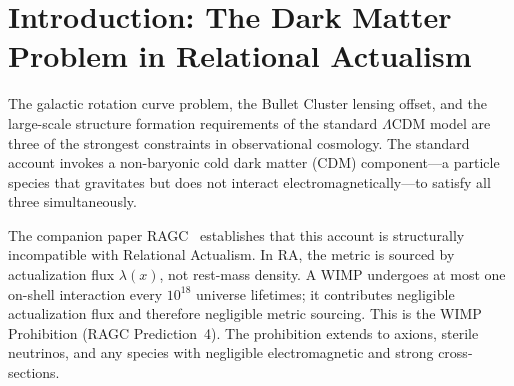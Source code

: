 \documentclass[11pt,a4paper]{article}
\theoremstyle{plain}
\theoremstyle{definition}
\theoremstyle{remark}
\begin{document}
\begin{abstract}
RA-CSG universality class, quantitative Bullet Cluster mapping,
CMB acoustic structure formation, and Weyl curvature sourcing.
A bandwidth-partition model of the Hubble tension---derived from the
Poisson-CSG generative measure of RAGC (Section~4.3 therein) via
$H_{\mathrm{eff}} = H_{\mathrm{CMB}}(1 + f_b|\delta|)$ where $f_b \approx 0.42$
is the void-filling baryon fraction---predicts
$H_{\mathrm{local}} \approx 73.1\;\mathrm{km\,s^{-1}\,Mpc^{-1}}$
from the KBC void ($\delta = -0.20$). New falsifiable prediction:
the Eridanus supervoid ($\delta \approx -0.30$) should give
$H \approx 75.9\;\mathrm{km\,s^{-1}\,Mpc^{-1}}$.

\medskip\noindent
\textbf{Keywords:} Dark Matter \textperiodcentered{} Causal DAG \textperiodcentered{}
Actualization Density \textperiodcentered{} Rotation Curves \textperiodcentered{}
Bullet Cluster \textperiodcentered{} MOND \textperiodcentered{} Emergent Gravity
\textperiodcentered{} Tully-Fisher \textperiodcentered{} Hubble Tension \textperiodcentered{} Eridanus Supervoid
\end{abstract}

\section{Introduction: The Dark Matter Problem in Relational Actualism}
\label{sec:intro}

The galactic rotation curve problem, the Bullet Cluster lensing offset, and the
large-scale structure formation requirements of the standard $\Lambda$CDM model
are three of the strongest constraints in observational cosmology. The standard
account invokes a non-baryonic cold dark matter (CDM) component---a particle
species that gravitates but does not interact electromagnetically---to satisfy all
three simultaneously.

The companion paper RAGC~\citep{Sandeman2026b} establishes that this account is
structurally incompatible with Relational Actualism. In RA, the metric is sourced
by actualization flux $\lambda(x)$, not rest-mass density. A WIMP undergoes at
most one on-shell interaction every $10^{18}$ universe lifetimes; it contributes
negligible actualization flux and therefore negligible metric sourcing. This is the
WIMP Prohibition (RAGC Prediction~4). The prohibition extends to axions, sterile
neutrinos, and any species with negligible electromagnetic and strong cross-sections.
\end{document}
